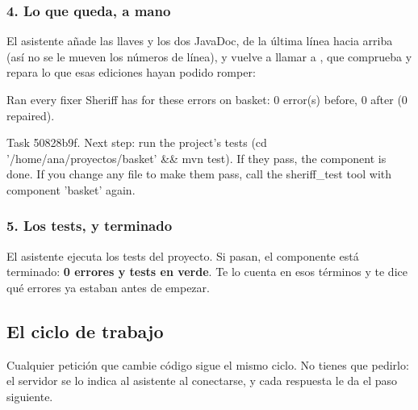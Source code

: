 \documentclass[11pt,a4paper]{article}
\begin{document}
\subsubsection{4. Lo que queda, a mano}
El asistente añade las llaves y los dos JavaDoc, de la última línea hacia arriba
(así no se le mueven los números de línea), y vuelve a llamar a
, que comprueba y repara lo que esas ediciones hayan podido
romper:

\begin{answer}
Ran every fixer Sheriff has for these errors on basket: 0 error(s) before, 0 after (0 repaired).

Task 50828b9f.
Next step: run the project's tests (cd '/home/ana/proyectos/basket' && mvn test). If they pass, the component is done. If you change any file to make them pass, call the sheriff_test tool with component 'basket' again.
\end{answer}

\subsubsection{5. Los tests, y terminado}
El asistente ejecuta los tests del proyecto. Si pasan, el componente está
terminado: \textbf{0 errores y tests en verde}. Te lo cuenta en esos términos y
te dice qué errores ya estaban antes de empezar.

\subsection{El ciclo de trabajo}

Cualquier petición que cambie código sigue el mismo ciclo. No tienes que
pedirlo: el servidor se lo indica al asistente al conectarse, y cada respuesta
le da el paso siguiente.
\end{document}
